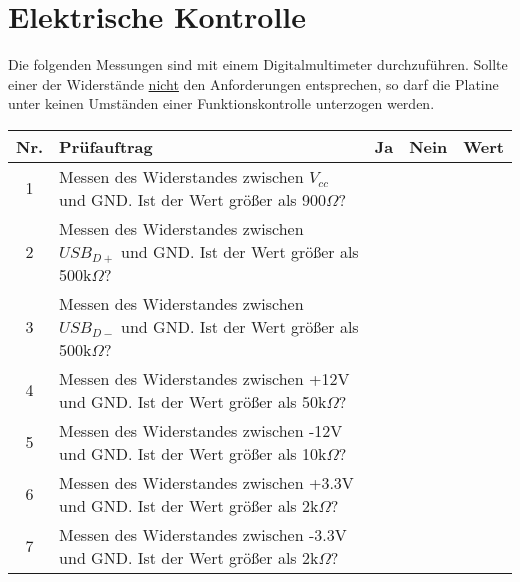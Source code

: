 \section{Elektrische Kontrolle}
Die folgenden Messungen sind mit einem Digitalmultimeter durchzuführen. Sollte einer der Widerstände \underline{nicht} den Anforderungen entsprechen, so darf die Platine unter keinen Umständen einer Funktionskontrolle unterzogen werden.
\begin{flushleft}
	\begin{tabular}{|c||p{10cm}|c|c|p{2cm}|}
		\hline
		Nr. & Prüfauftrag & Ja & Nein & Wert\\
		\hline
		1 & Messen des Widerstandes zwischen $V_{cc}$ und GND. Ist der Wert größer als 900$\Omega$? & & &\\
		\hline
		2 & Messen des Widerstandes zwischen $USB_{D+}$ und GND. Ist der Wert größer als 500k$\Omega$? & & & \\
		\hline
		3 & Messen des Widerstandes zwischen $USB_{D-}$ und GND. Ist der Wert größer als 500k$\Omega$? & & & \\			\hline
		4 & Messen des Widerstandes zwischen +12V und GND. Ist der Wert größer als 50k$\Omega$? & & & \\
		\hline
		5 & Messen des Widerstandes zwischen -12V und GND. Ist der Wert größer als 10k$\Omega$? &&& \\
		\hline
		6 & Messen des Widerstandes zwischen +3.3V und GND. Ist der Wert größer als 2k$\Omega$? &&& \\
		\hline
		7 & Messen des Widerstandes zwischen -3.3V und GND. Ist der Wert größer als 2k$\Omega$? &&& \\
		\hline
	\end{tabular}
\end{flushleft}

